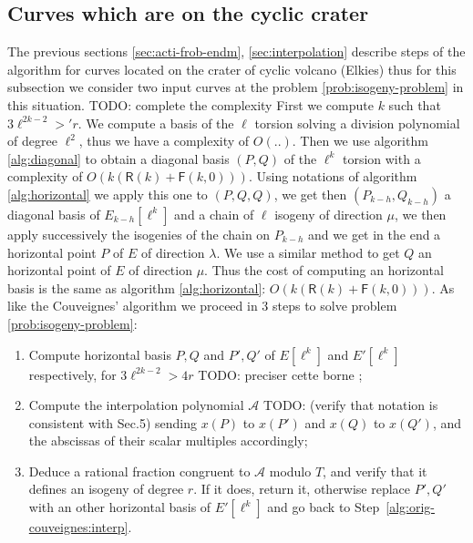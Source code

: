 \documentclass{lms}
\newcommand{\todo}[1]{{\color{red}TODO: #1}}
\begin{document}
 \subsection{Curves which are on the cyclic crater}
  The previous sections \ref{sec:acti-frob-endm}, \ref{sec:interpolation} describe steps of the algorithm for curves located on the crater of cyclic volcano (Elkies) thus for this subsection we consider two input curves at the problem \ref{prob:isogeny-problem} in this situation. 
\newline
\todo{complete the complexity}
 First we compute $k$ such that $3\ell^{2k-2}>'r$. We compute a basis of the $\ell$ torsion solving a division polynomial of degree $\ell^2$, thus we have a complexity of $O(..)$.%
 Then we use algorithm \ref{alg:diagonal} to obtain a diagonal basis $(P,Q)$ of the $\ell^k$ torsion with a complexity of $O(k(\mathsf{R}(k)+\mathsf{F}(k,0)))$. Using notations of algorithm \ref{alg:horizontal} we apply this one to $(P,Q,Q)$, we get then $(P_{k-h},Q_{k-h})$ a diagonal basis of $E_{k-h}[\ell^k]$ and a chain of $\ell$ isogeny of direction $\mu$, we then apply successively the isogenies of the chain on $P_{k-h}$ and we get in the end a horizontal point $P$ of $E$ of direction $\lambda$. We use a similar method to get $Q$ an horizontal point of $E$ of direction $\mu$. Thus the cost of computing an horizontal basis is the same as algorithm \ref{alg:horizontal}: $O(k(\mathsf{R}(k)+\mathsf{F}(k,0)))$.  
\newline  
  As like the Couveignes' algorithm we proceed in 3 steps to solve problem \ref{prob:isogeny-problem}:
 \begin{enumerate}
\item Compute horizontal basis $P,Q$ and $P',Q'$ of
  $E[\ell^k]$ and $E'[\ell^k]$ respectively, for $3\ell^{2k-2} > 4r$ \todo{preciser cette borne} ;
\item\label{alg:modif-couveignes:interp} Compute the interpolation
  polynomial $\mathcal{A}$ \todo{(verify that notation is consistent
    with Sec.5)} sending $x(P)$ to $x(P')$ and $x(Q)$ to $x(Q')$, and the abscissas of
  their scalar multiples accordingly;
\item\label{alg:modif-couveignes:rational} Deduce a rational fraction
  congruent to $\mathcal{A}$ modulo $T$, and verify that it
  defines an isogeny of degree $r$. If it does, return it, otherwise
  replace $P',Q'$ with an other horizontal basis of $E'[\ell^k]$ and go back to
  Step~\ref{alg:orig-couveignes:interp}.
\end{enumerate} 
\end{document}
